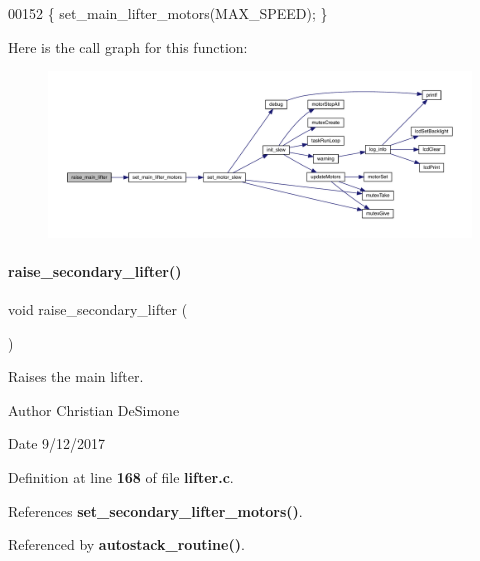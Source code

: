 \begin{DoxyCode}
00152 \{ set_main_lifter_motors(MAX\_SPEED); \}
\end{DoxyCode}
Here is the call graph for this function\+:
\nopagebreak
\begin{figure}[H]
\begin{center}
\leavevmode
\includegraphics[width=350pt]{lifter_8h_a2e2bd38b5b8b52378f3510368bf8aa0a_cgraph}
\end{center}
\end{figure}
\mbox{\label{lifter_8h_a786f679ea48bb8c80e00fbac9a69911b}} 
\paragraph{raise\+\_\+secondary\+\_\+lifter()}
{\footnotesize\ttfamily void raise\+\_\+secondary\+\_\+lifter (\begin{DoxyParamCaption}{ }\end{DoxyParamCaption})}



Raises the main lifter. 

\begin{DoxyAuthor}{Author}
Christian De\+Simone 
\end{DoxyAuthor}
\begin{DoxyDate}{Date}
9/12/2017 
\end{DoxyDate}


Definition at line \textbf{ 168} of file \textbf{ lifter.\+c}.



References \textbf{ set\+\_\+secondary\+\_\+lifter\+\_\+motors()}.



Referenced by \textbf{ autostack\+\_\+routine()}.



